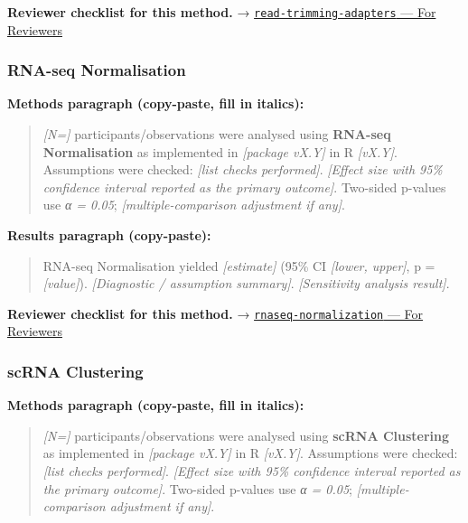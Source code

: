\documentclass[
]{article}
\begin{document}
\textbf{Reviewer checklist for this method.} →
\href{../chapters/12-bioinformatics/read-trimming-adapters.Rmd\#for-reviewers}{\texttt{read-trimming-adapters}
--- For Reviewers}

\subsubsection{RNA-seq Normalisation}\label{rna-seq-normalisation}

\textbf{Methods paragraph (copy-paste, fill in italics):}

\begin{quote}
\emph{{[}N={]}} participants/observations were analysed using
\textbf{RNA-seq Normalisation} as implemented in \emph{{[}package
vX.Y{]}} in R \emph{{[}vX.Y{]}}. Assumptions were checked: \emph{{[}list
checks performed{]}}. \emph{{[}Effect size with 95\% confidence interval
reported as the primary outcome{]}}. Two-sided p-values use \emph{α =
0.05}; \emph{{[}multiple-comparison adjustment if any{]}}.
\end{quote}

\textbf{Results paragraph (copy-paste):}

\begin{quote}
RNA-seq Normalisation yielded \emph{{[}estimate{]}} (95\% CI
\emph{{[}lower, upper{]}}, p = \emph{{[}value{]}}). \emph{{[}Diagnostic
/ assumption summary{]}}. \emph{{[}Sensitivity analysis result{]}}.
\end{quote}

\textbf{Reviewer checklist for this method.} →
\href{../chapters/12-bioinformatics/rnaseq-normalization.Rmd\#for-reviewers}{\texttt{rnaseq-normalization}
--- For Reviewers}

\subsubsection{scRNA Clustering}\label{scrna-clustering}

\textbf{Methods paragraph (copy-paste, fill in italics):}

\begin{quote}
\emph{{[}N={]}} participants/observations were analysed using
\textbf{scRNA Clustering} as implemented in \emph{{[}package vX.Y{]}} in
R \emph{{[}vX.Y{]}}. Assumptions were checked: \emph{{[}list checks
performed{]}}. \emph{{[}Effect size with 95\% confidence interval
reported as the primary outcome{]}}. Two-sided p-values use \emph{α =
0.05}; \emph{{[}multiple-comparison adjustment if any{]}}.
\end{quote}
\end{document}
